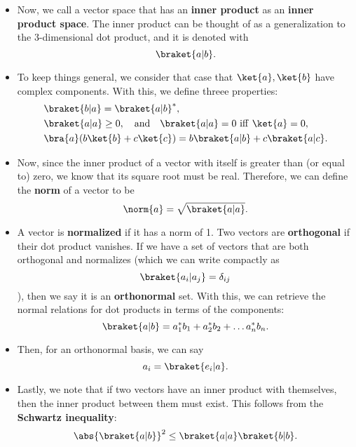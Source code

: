 \begin{itemize}
    \item Now, we call a vector space that has an \textbf{inner product} as an \textbf{inner product space}. The inner product can be thought of as a generalization to the 3-dimensional dot product, and it is denoted with
        \begin{equation*}
            \braket{a|b}.
        \end{equation*}
    \item To keep things general, we consider that case that $\ket{a},\ket{b}$ have complex components. With this, we define threee properties:
        \begin{align*}
            &\braket{b|a} = \braket{a|b}^*, \\
            &\braket{a|a} \geq 0, \quad \mathrm{and} \quad \braket{a|a} = 0 \ \mathrm{iff} \ \ket{a}=0, \\
            &\bra{a}(b\ket{b} + c\ket{c}) = b\braket{a|b} + c\braket{a|c}.
        \end{align*}
    \item Now, since the inner product of a vector with itself is greater than (or equal to) zero, we know that its square root must be real. Therefore, we can define the \textbf{norm} of a vector to be
        \begin{equation*}
            \norm{a} = \sqrt{\braket{a|a}}.
        \end{equation*}
    \item A vector is \textbf{normalized} if it has a norm of 1. Two vectors are \textbf{orthogonal} if their dot product vanishes. If we have a set of vectors that are both orthogonal and normalizes (which we can write compactly as
        \begin{equation*}
            \braket{a_i|a_j} = \delta_{ij}
        \end{equation*}
    ), then we say it is an \textbf{orthonormal} set. With this, we can retrieve the normal relations for dot products in terms of the components:
        \begin{equation*}
            \braket{a|b} = a_1^*b_1 + a_2^*b_2 + \ldots a_n^*b_n.
        \end{equation*}
    \item Then, for an orthonormal basis, we can say
        \begin{equation*}
            a_i = \braket{e_i|a}.
        \end{equation*}
    \item Lastly, we note that if two vectors have an inner product with themselves, then the inner product between them must exist. This follows from the \textbf{Schwartz inequality}:
        \begin{equation}
            \abs{\braket{a|b}}^2 \leq \braket{a|a}\braket{b|b}.
        \end{equation}
\end{itemize}



